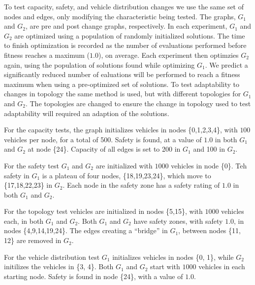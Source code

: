 To test capacity, safety, and vehicle distribution changes we use the same set of nodes and edges, only modifying the characteristic being tested. The graphs, $G_1$ and $G_2$, are pre and post change graphs, respectively. In each experiment, $G_1$ and $G_2$ are optimized using a population of randomly initialized solutions. The time to finish optimization is recorded as the number of evaluations performed before fitness reaches a maximum ($1.0$), on average. Each experiment then optimzies $G_2$ again, using the population of solutions found while optimizing $G_1$. We predict a significantly reduced number of ealuations will be performed to reach a fitness maximum when using a pre-optimized set of solutions.
To test adaptability to changes in topology the same method is used, but with different topologies for $G_1$ and $G_2$. The topologies are changed to ensure the change in topology used to test adaptability will required an adaption of the solutions.

For the capacity tests, the graph initializes vehicles in nodes \{0,1,2,3,4\}, with $100$ vehicles per node, for a total of 500. Safety is found, at a value of $1.0$ in both $G_1$ and $G_2$ at node \{24\}. Capacity of all edges is set to 200 in $G_1$ and 100 in $G_2$.

For the safety test $G_1$ and $G_2$ are initialized with $1000$ vehicles in node \{0\}. Teh safety in $G_1$ is a plateau of four nodes, \{18,19,23,24\}, which move to \{17,18,22,23\} in $G_2$. Each node in the safety zone has a safety rating of $1.0$ in both $G_1$ and $G_2$.

For the topology test vehicles are initialized in nodes \{5,15\}, with $1000$ vehicles each, in both $G_1$ and $G_2$. Both $G_1$ and $G_2$ have safety zones, with safety $1.0$, in nodes \{4,9,14,19,24\}. The edges creating a ``bridge'' in $G_1$, between nodes \{11, 12\} are removed in $G_2$.

For the vehicle distribution test $G_1$ initializes vehicles in nodes \{0, 1\}, while $G_2$ initilizes the vehicles in \{3, 4\}. Both $G_1$ and $G_2$ start with $1000$ vehicles in each starting node. Safety is found in node \{24\}, with a value of $1.0$.

